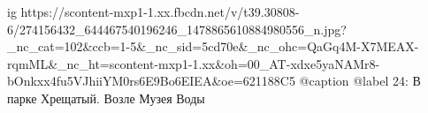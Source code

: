  
 
 
 
 

\ifcmt
  ig https://scontent-mxp1-1.xx.fbcdn.net/v/t39.30808-6/274156432_644467540196246_1478865610884980556_n.jpg?_nc_cat=102&ccb=1-5&_nc_sid=5cd70e&_nc_ohc=QaGq4M-X7MEAX-rqmML&_nc_ht=scontent-mxp1-1.xx&oh=00_AT-xdxe5yaNAMr8-bOnkxx4fu5VJhiiYM0rs6E9Bo6EIEA&oe=621188C5
  @caption @label 24: В парке Хрещатый. Возле Музея Воды
\fi
